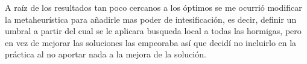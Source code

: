 A raíz de los resultados tan poco cercanos a los óptimos se me ocurrió modificar la metaheurística para añadirle mas poder de intesificación, es decir, definir un umbral a partir del cual se le aplicara busqueda local a todas las hormigas, pero en vez de mejorar las soluciones las empeoraba así que decidí no incluirlo en la práctica al no aportar nada a la mejora de la solución.\\



